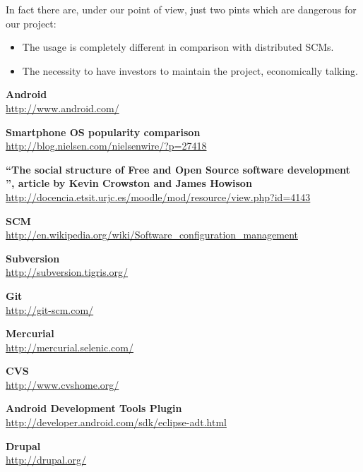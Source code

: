 \documentclass[a4paper,10pt]{article}
\begin{document}
In fact there are, under our point of view, just two pints which are dangerous
for our project:
\begin{itemize}
 \item The usage is completely different in comparison with distributed SCMs.
 \item The necessity to have investors to maintain the project, economically
talking.
\end{itemize}

\newpage

\begin{thebibliography}{25}
 

\textbf{Android}\\
{\footnotesize\url{http://www.android.com/}}

\textbf{Smartphone OS popularity comparison}\\
{\footnotesize\url{http://blog.nielsen.com/nielsenwire/?p=27418}}

\textbf{“The social structure of Free and Open Source software
development ”, article by Kevin Crowston and James Howison}\\
{\footnotesize\url{
http://docencia.etsit.urjc.es/moodle/mod/resource/view.php?id=4143}}

\textbf{SCM}\\
{\footnotesize\url{
http://en.wikipedia.org/wiki/Software_configuration_management}}

\textbf{Subversion}\\
{\footnotesize\url{http://subversion.tigris.org/}}

\textbf{Git}\\
{\footnotesize\url{http://git-scm.com/}}

\textbf{Mercurial}\\
{\footnotesize\url{http://mercurial.selenic.com/}}

\textbf{CVS}\\
{\footnotesize\url{http://www.cvshome.org/}}

\textbf{Android Development Tools Plugin}\\
{\footnotesize\url{http://developer.android.com/sdk/eclipse-adt.html}}

\textbf{Drupal}\\
{\footnotesize\url{http://drupal.org/}}


\end{thebibliography}
\end{document}
